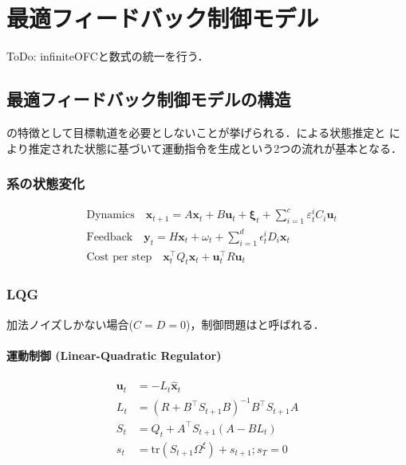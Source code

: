 \section{最適フィードバック制御モデル}
ToDo: infiniteOFCと数式の統一を行う．

\subsection{最適フィードバック制御モデルの構造}
\textbf{} の特徴として目標軌道を必要としないことが挙げられる．\textbf{}による状態推定と\textbf{} により推定された状態に基づいて運動指令を生成という2つの流れが基本となる．
\subsubsection{系の状態変化}


\begin{align}
&\text {Dynamics} \quad \mathbf{x}_{t+1}=A \mathbf{x}_{t}+B \mathbf{u}_{t}+\boldsymbol{\xi}_{t}+\sum_{i=1}^{c} \varepsilon_{t}^{i} C_{i} \mathbf{u}_{t}\\
&\text {Feedback} \quad \mathbf{y}_{t}=H \mathbf{x}_{t}+\omega_{t}+\sum_{i=1}^{d} \epsilon_{t}^{i} D_{i} \mathbf{x}_{t}\\
&\text{Cost per step}\quad \mathbf{x}_{t}^\top Q_{t} \mathbf{x}_{t}+\mathbf{u}_{t}^\top R \mathbf{u}_{t}
\end{align}


\subsubsection{LQG}
加法ノイズしかない場合($C=D=0$)，制御問題は\textbf{}と呼ばれる．


\paragraph{運動制御 (Linear-Quadratic Regulator)}


\begin{align}
\mathbf{u}_{t}&=-L_{t} \widehat{\mathbf{x}}_{t}\\
L_{t}&=\left(R+B^{\top} S_{t+1} B\right)^{-1} B^{\top} S_{t+1} A\\
S_{t}&=Q_{t}+A^{\top} S_{t+1}\left(A-B L_{t}\right)\\
s_t &= \mathrm{tr}(S_{t+1}\Omega^\xi) + s_{t+1}; s_T=0
\end{align}


